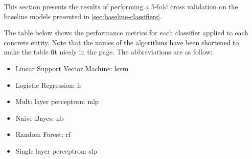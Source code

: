 \documentclass[epsfig,a4paper,11pt,titlepage,twoside,openany]{book}
\begin{document}
This section presents the results of performing a 5-fold cross validation on the baseline models presented in \autoref{sec:baseline-classifiers}. 

The table below shows the performance metrics for each classifier applied to each concrete entity. Note that the names of the algorithms have been shortened to make the table fit nicely in the page. The abbreviations are as follow:

\begin{itemize}
    \item Linear Support Vector Machine: lsvm
    \item Logistic Regression: lr
    \item Multi layer perceptron: mlp
    \item Naive Bayes: nb
    \item Random Forest: rf
    \item Single layer perceptron: slp
\end{itemize}
\end{document}
